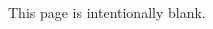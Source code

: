 \documentclass[12pt]{calcexam}
\begin{document}
\begin{multicols*}{2}





%




%


\clearpage%
This page is intentionally blank.\columnbreak%

%


{\def\side{L}}

%

{\def\side{R}}

{\def\side{R}}
%

\clearpage
%
%
\end{multicols*}
\end{document}
